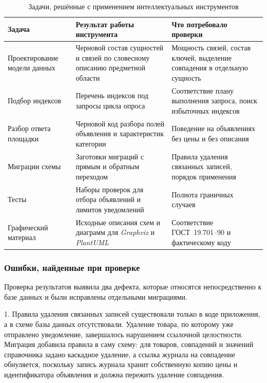\begin{table}[ht]
\caption{Задачи, решённые с применением интеллектуальных инструментов}
\label{table:development:ai}
\centering
	\begin{tabular}{|>{\raggedright}m{}
	                |>{\raggedright}m{}
	                |>{\raggedright\arraybackslash}m{}|}
	\hline
	\centering Задача & \centering Результат работы инструмента & \centering\arraybackslash Что потребовало проверки \\
	\hline Проектирование модели данных & Черновой состав сущностей и связей по словесному описанию предметной области & Мощность связей, состав ключей, выделение совпадения в отдельную сущность \\
	\hline Подбор индексов & Перечень индексов под запросы цикла опроса & Соответствие плану выполнения запроса, поиск избыточных индексов \\
	\hline Разбор ответа площадки & Черновой код разбора полей объявления и характеристик категории & Поведение на объявлениях без цены и без описания \\
	\hline Миграции схемы & Заготовки миграций с прямым и обратным переходом & Правила удаления связанных записей, порядок применения \\
	\hline Тесты & Наборы проверок для отбора объявлений и лимитов уведомлений & Полнота граничных случаев \\
	\hline Графический материал & Исходные описания схем и диаграмм для \textit{Graphviz} и \textit{PlantUML} & Соответствие ГОСТ~19.701–90 и фактическому коду \\
	\hline
	\end{tabular}
\end{table}

\subsubsection{Ошибки, найденные при проверке}

Проверка результатов выявила два дефекта, которые относятся непосредственно к базе данных и были исправлены отдельными миграциями.

1. Правила удаления связанных записей существовали только в коде приложения, а в схеме базы данных отсутствовали. Удаление товара, по которому уже отправлено уведомление, завершалось нарушением ссылочной целостности. Миграция добавила правила в саму схему: для товаров, совпадений и значений справочника задано каскадное удаление, а ссылка журнала на совпадение обнуляется, поскольку запись журнала хранит собственную копию цены и идентификатора объявления и должна пережить удаление совпадения.


